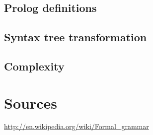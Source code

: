 \documentclass[a4paper]{article}
\begin{document}
\subsection*{Prolog definitions}

\subsection*{Syntax tree transformation}

\subsection*{Complexity}

\section*{Sources}
\url{http://en.wikipedia.org/wiki/Formal_grammar}
\end{document}

